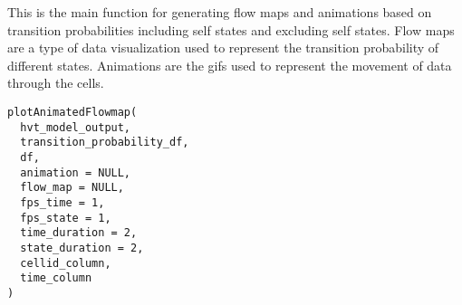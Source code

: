 \documentclass[letterpaper]{book}
\begin{document}
%
\begin{Description}
This is the main function for generating flow maps and animations based on transition probabilities
including self states and excluding self states.
Flow maps are a type of data visualization used to represent the transition probability of different states. 
Animations are the gifs used to represent the movement of data through the cells.
\end{Description}
%
\begin{Usage}
\begin{verbatim}
plotAnimatedFlowmap(
  hvt_model_output,
  transition_probability_df,
  df,
  animation = NULL,
  flow_map = NULL,
  fps_time = 1,
  fps_state = 1,
  time_duration = 2,
  state_duration = 2,
  cellid_column,
  time_column
)
\end{verbatim}
\end{Usage}
%
\end{document}
